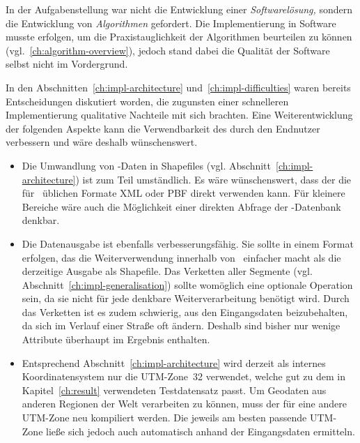 \documentclass[../main/thesis.tex]{subfiles}
\begin{document}
In der Aufgabenstellung war nicht die Entwicklung einer \emph{Softwarelösung,} sondern die Entwicklung von \emph{Algorithmen} gefordert.
Die Implementierung in Software musste erfolgen, um die Praxistauglichkeit der Algorithmen beurteilen zu können (vgl.~\ref{ch:algorithm-overview}), jedoch stand dabei die Qualität der Software selbst nicht im Vordergrund.

In den Abschnitten~\ref{ch:impl-architecture} und~\ref{ch:impl-difficulties} waren bereits Entscheidungen diskutiert worden, die zugunsten einer schnelleren Implementierung qualitative Nachteile mit sich brachten.
Eine Weiterentwicklung der folgenden Aspekte kann die Verwendbarkeit des  durch den Endnutzer verbessern und wäre deshalb wünschenswert.
%
\begin{itemize}

\item
Die Umwandlung von \osm-Daten in Shapefiles (vgl. Abschnitt~\ref{ch:impl-architecture}) ist zum Teil umständlich.
Es wäre wünschenswert, dass der  die für \osm\ üblichen Formate XML oder PBF direkt verwenden kann.
Für kleinere Bereiche wäre auch die Möglichkeit einer direkten Abfrage der \osm-Datenbank denkbar.

\item
Die Datenausgabe ist ebenfalls verbesserungsfähig.
Sie sollte in einem Format erfolgen, das die Weiterverwendung innerhalb von \osm\ einfacher macht als die derzeitige Ausgabe als Shapefile.
Das Verketten aller Segmente (vgl. Abschnitt~\ref{ch:impl-generalisation}) sollte womöglich eine optionale Operation sein, da sie nicht für jede denkbare Weiterverarbeitung benötigt wird.
Durch das Verketten ist es zudem schwierig,  aus den Eingangsdaten beizubehalten, da sich  im Verlauf einer Straße oft ändern.
Deshalb sind bisher nur wenige Attribute überhaupt im Ergebnis enthalten.

\item
Entsprechend Abschnitt~\ref{ch:impl-architecture} wird derzeit als internes Koordinatensystem nur die UTM-Zone~32 verwendet, welche gut zu dem in Kapitel~\ref{ch:result} verwendeten Testdatensatz passt.
Um Geodaten aus anderen Regionen der Welt verarbeiten zu können, muss der  für eine andere UTM-Zone neu kompiliert werden.
Die jeweils am besten passende UTM-Zone ließe sich jedoch auch automatisch anhand der Eingangsdaten ermitteln.


\end{itemize}
\end{document}
